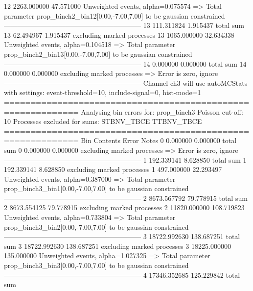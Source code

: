 12         2263.000000     47.571000       Unweighted events, alpha=0.075574
  => Total parameter prop_binch2_bin12[0.00,-7.00,7.00] to be gaussian constrained
------------------------------------------------------------
13         111.311824      1.915437        total sum                     
13         62.494967       1.915437        excluding marked processes    
13         1065.000000     32.634338       Unweighted events, alpha=0.104518
  => Total parameter prop_binch2_bin13[0.00,-7.00,7.00] to be gaussian constrained
------------------------------------------------------------
14         0.000000        0.000000        total sum                     
14         0.000000        0.000000        excluding marked processes    
  => Error is zero, ignore      
------------------------------------------------------------
Channel ch3 will use autoMCStats with settings: event-threshold=10, include-signal=0, hist-mode=1
============================================================
Analysing bin errors for: prop_binch3
Poisson cut-off: 10
Processes excluded for sums: STBNV_TBCE TTBNV_TBCE
============================================================
Bin        Contents        Error           Notes                         
0          0.000000        0.000000        total sum                     
0          0.000000        0.000000        excluding marked processes    
  => Error is zero, ignore      
------------------------------------------------------------
1          192.339141      8.628850        total sum                     
1          192.339141      8.628850        excluding marked processes    
1          497.000000      22.293497       Unweighted events, alpha=0.387000
  => Total parameter prop_binch3_bin1[0.00,-7.00,7.00] to be gaussian constrained
------------------------------------------------------------
2          8673.567792     79.778915       total sum                     
2          8673.554125     79.778915       excluding marked processes    
2          11820.000000    108.719823      Unweighted events, alpha=0.733804
  => Total parameter prop_binch3_bin2[0.00,-7.00,7.00] to be gaussian constrained
------------------------------------------------------------
3          18722.992630    138.687251      total sum                     
3          18722.992630    138.687251      excluding marked processes    
3          18225.000000    135.000000      Unweighted events, alpha=1.027325
  => Total parameter prop_binch3_bin3[0.00,-7.00,7.00] to be gaussian constrained
------------------------------------------------------------
4          17346.352685    125.229842      total sum                     
